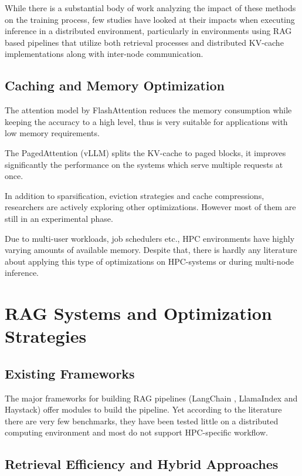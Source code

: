 While there is a substantial body of work analyzing the impact of these methods on the training process, few studies have looked at their impacts when executing inference in a distributed environment, particularly in environments using RAG based pipelines that utilize both retrieval processes and distributed KV-cache implementations along with inter-node communication.

\subsection{Caching and Memory Optimization}

The attention model by FlashAttention \cite { dao2022flashattention } reduces the memory consumption while keeping the accuracy to a high level, thus is very suitable for applications with low memory requirements.

The PagedAttention (vLLM) splits the \ac{KV-cache} to paged blocks, it improves significantly the performance on the systems which serve multiple requests at once.

In addition to sparsification, eviction strategies and cache compressions, researchers are actively exploring other optimizations. However most of them are still in an experimental phase.

Due to multi-user workloads, job schedulers etc., HPC environments have highly varying amounts of available memory. Despite that, there is hardly any literature about applying this type of optimizations on HPC-systems or during multi-node inference.

\section{RAG Systems and Optimization Strategies}

\subsection{Existing Frameworks}

The major frameworks for building RAG pipelines (LangChain \cite{langchain2023}, LlamaIndex \cite{llamaindex2023} and Haystack) offer modules to build the pipeline. Yet according to the literature there are very few benchmarks, they have been tested little on a distributed computing environment and most do not support HPC-specific workflow.

\subsection{Retrieval Efficiency and Hybrid Approaches}

